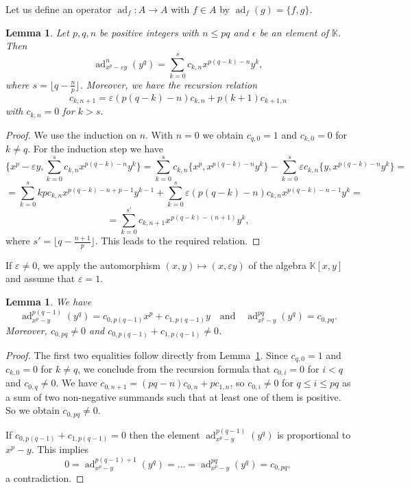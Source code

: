 \documentclass[a4paper,draft,reqno,12pt]{amsart}
\newtheorem{lemma}[theorem]{Lemma}
\theoremstyle{definition}
\theoremstyle{remark}
\DeclareMathOperator{\adj}{ad}
\def\KK{{\mathbb K}}
\renewcommand{\le}{\leqslant}
\begin{document}
\smallskip

Let us define an operator $\adj_f\colon A\to A$ with $f\in A$ by $\adj_f(g)=\{f,g\}$. 

\begin{lemma} \label{lem2}
Let $p,q,n$ be positive integers with $n\le pq$ and $\epsilon$ be an element of $\KK$. Then 
\[
\adj_{x^p - \varepsilon y}^{n}(y^q) = \sum_{k=0}^s c_{k,n} x^{p(q-k) - n} y^k,
\]
where $s=\lfloor q-\frac{n}{p}\rfloor$. Moreover, we have 
the recursion relation
\[
c_{k, n+1} = \varepsilon (p (q - k) - n) c_{k,n} + p (k+1) c_{k+1,n}
\]
with $c_{k,n}=0$ for $k>s$.
\end{lemma}

\begin{proof} 
We use the induction on $n$. With $n=0$ we obtain
$c_{q,0} = 1$ and $c_{k,0} = 0$ for $k \neq q$. 
For the induction step we have 
$$
\{ x^p - \varepsilon y, \sum_{k=0}^s c_{k,n} x^{p(q-k) - n} y^k \} = \sum_{k=0}^s c_{k,n} \{ x^p, x^{p(q-k) - n} y^k \} - \sum_{k=0}^s \varepsilon c_{k,n}\{ y, x^{p(q-k) - n} y^k \} =
$$
$$
= \sum_{k=0}^s  k p c_{k,n} x^{p(q-k) - n + p - 1} y^{k-1} + \sum_{k=0}^s \varepsilon (p(q-k) - n) c_{k,n}  x^{p(q-k) - n - 1} y^k =
$$
$$
= \sum_{k=0}^{s'} c_{k,n+1} x^{p(q-k) - (n+1)} y^k, 
$$
where $s'=\lfloor q-\frac{n+1}{p}\rfloor$. This leads to the required relation. 
\end{proof}

If $\varepsilon\ne 0$, we apply the automorphism $(x,y)\mapsto (x,\varepsilon y)$ of the algebra $\KK[x,y]$ and assume that $\varepsilon=1$. 

\begin{lemma} \label{lem3}
We have 
$$
\adj_{x^p - y}^{p(q-1)}(y^q) = c_{0,p(q-1)} x^{p} + c_{1,p(q-1)}	 y \quad \text{and} \quad \adj_{x^p - y}^{pq}(y^q) = c_{0,pq}. 
$$
Moreover, $c_{0,pq} \neq 0$ and $c_{0,p(q-1)} +c_{1,p(q-1)}\ne 0$. \\
\end{lemma}

\begin{proof}
The first two equalities follow directly from Lemma~\ref{lem2}. Since $c_{q,0} = 1$ and $c_{k,0} = 0$ for $k \neq q$, we conclude from the recursion formula that
$c_{0,i}=0$ for $i<q$ and $c_{0,q}\ne 0$.  We have $c_{0, n+1} = (pq - n) c_{0,n} + p c_{1,n}$, so $c_{0,i}\ne 0$ for $q\le i\le pq$ as a sum of two non-negative summands
such that at least one of them is positive. So we obtain $c_{0,pq}\ne 0$. 

If $c_{0,p(q-1)} +c_{1,p(q-1)}=0$ then the element $\adj_{x^p - y}^{p(q-1)}(y^q)$ is proportional to $x^p-y$.  This implies 
$$
0=\adj_{x^p - y}^{p(q-1)+1}(y^q)=\ldots=\adj_{x^p - y}^{pq}(y^q)=c_{0,pq},
$$
a contradiction. 
\end{proof}
\end{document}

